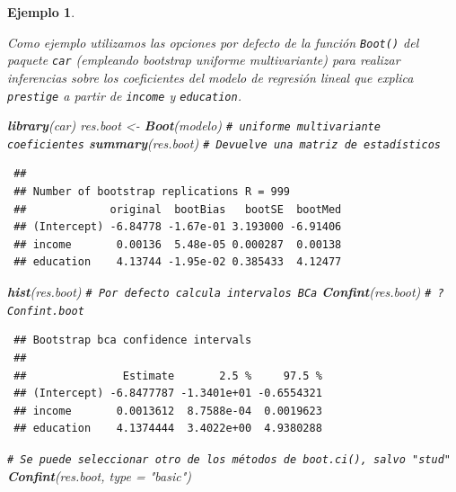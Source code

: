 \documentclass[
  spanish,
  10pt,
]{book}
\newenvironment{Shaded}{\begin{snugshade}}{\end{snugshade}}
\newcommand{\AttributeTok}[1]{\textcolor[rgb]{0.13,0.29,0.53}{#1}}
\newcommand{\CommentTok}[1]{\textcolor[rgb]{0.56,0.35,0.01}{\textit{#1}}}
\newcommand{\FunctionTok}[1]{\textcolor[rgb]{0.13,0.29,0.53}{\textbf{#1}}}
\newcommand{\NormalTok}[1]{#1}
\newcommand{\OtherTok}[1]{\textcolor[rgb]{0.56,0.35,0.01}{#1}}
\newcommand{\StringTok}[1]{\textcolor[rgb]{0.31,0.60,0.02}{#1}}
\theoremstyle{break}
\newtheorem{example}{Ejemplo}[chapter]
\theoremstyle{nonumberplain}
\renewcommand{\CommentTok}[1]{\textcolor[rgb]{0.41,0.41,0.41}{\texttt{#1}}}
\begin{document}
\begin{example}
\protect\hypertarget{exm:boot-car-coef}{}\label{exm:boot-car-coef}

Como ejemplo utilizamos las opciones por defecto de la función \texttt{Boot()} del paquete \texttt{car} (empleando bootstrap uniforme multivariante) para realizar inferencias sobre los coeficientes del modelo de regresión lineal que explica \texttt{prestige} a partir de \texttt{income} y \texttt{education}.

\begin{Shaded}
\begin{Highlighting}[]
\FunctionTok{library}\NormalTok{(car)}
\NormalTok{res.boot }\OtherTok{\textless{}{-}} \FunctionTok{Boot}\NormalTok{(modelo) }\CommentTok{\# uniforme multivariante coeficientes}
\FunctionTok{summary}\NormalTok{(res.boot) }\CommentTok{\# Devuelve una matriz de estadísticos}
\end{Highlighting}
\end{Shaded}

\begin{verbatim}
 ## 
 ## Number of bootstrap replications R = 999 
 ##             original  bootBias   bootSE  bootMed
 ## (Intercept) -6.84778 -1.67e-01 3.193000 -6.91406
 ## income       0.00136  5.48e-05 0.000287  0.00138
 ## education    4.13744 -1.95e-02 0.385433  4.12477
\end{verbatim}

\begin{Shaded}
\begin{Highlighting}[]
\FunctionTok{hist}\NormalTok{(res.boot)}
\CommentTok{\# Por defecto calcula intervalos BCa}
\FunctionTok{Confint}\NormalTok{(res.boot) }\CommentTok{\# ?Confint.boot}
\end{Highlighting}
\end{Shaded}

\begin{verbatim}
 ## Bootstrap bca confidence intervals
 ## 
 ##               Estimate       2.5 %     97.5 %
 ## (Intercept) -6.8477787 -1.3401e+01 -0.6554321
 ## income       0.0013612  8.7588e-04  0.0019623
 ## education    4.1374444  3.4022e+00  4.9380288
\end{verbatim}

\begin{Shaded}
\begin{Highlighting}[]
\CommentTok{\# Se puede seleccionar otro de los métodos de boot.ci(), salvo "stud"}
\FunctionTok{Confint}\NormalTok{(res.boot, }\AttributeTok{type =} \StringTok{"basic"}\NormalTok{)}
\end{Highlighting}
\end{Shaded}


\end{example}
\end{document}
